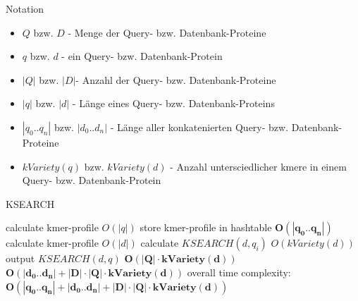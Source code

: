 \documentclass[xcolor=dvipsnames, aspectratio=1610]{beamer}
\begin{document}
\begin{frame}{Notation}
  \begin{itemize}
    \item $Q$ bzw. $D$ - Menge der Query- bzw. Datenbank-Proteine
    \item $q$ bzw. $d$ - ein Query- bzw. Datenbank-Protein
    \item $|Q|$ bzw. $|D|$- Anzahl der Query- bzw. Datenbank-Proteine
    \item $|q|$ bzw. $|d|$ - Länge eines Query- bzw. Datenbank-Proteins
    \item $|q_0..q_n|$ bzw. $|d_0..d_n|$ - Länge aller konkatenierten Query- bzw. Datenbank-Proteine
    \item $kVariety(q)$ bzw. $kVariety(d)$ - Anzahl untersciedlicher kmere in einem Query- bzw. Datenbank-Protein
  \end{itemize}
\end{frame}

\begin{frame}{KSEARCH}
 \begin{algorithmic}
        \State calculate kmer-profile \Comment $O(|q|)$
        \State store kmer-profile in hashtable
      \EndFor \Comment $\boldsymbol{O(|q_0..q_n|)}$
         \State calculate kmer-profile \Comment $O(|d|)$
           \State calculate $KSEARCH(d,q_{i})$ \Comment $O(kVariety(d))$   
           \State output $KSEARCH(d,q)$
         \EndFor \Comment $\boldsymbol{ O(|Q| \cdot kVariety(d))}$
       \EndFor   \Comment $\boldsymbol{O(|d_0..d_n|+|D| \cdot |Q| \cdot kVariety(d))}$  
    \EndFunction \Comment overall time complexity: $\boldsymbol{O(|q_0..q_n|+|d_0..d_n|+|D| \cdot |Q| \cdot kVariety(d))}$

  \end{algorithmic}
\end{frame}
\end{document}
